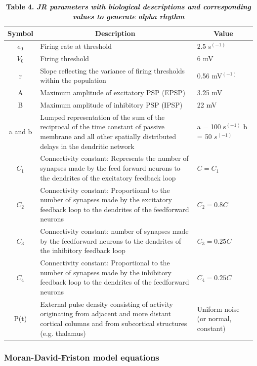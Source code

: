 \documentclass[12pt,twoside]{article}
\begin{document}
\begin{table}[H]
\centering %
\begin{tabular}{|c|p{10cm}|p{4cm}| }
\hline
Symbol & \multicolumn{1}{|c|}{Description} & \multicolumn{1}{c|}{Value}  \\ 
 \hline
{$e_{0}$} & Firing rate at threshold & 2.5 s$^{(-1)}$ \\ 
 \hline
 $V_{0}$ & Firing threshold	& 6 mV \\ 
 \hline
 r	& Slope reflecting the variance of firing thresholds within the population &	0.56 mV$^{(-1)}$ \\
 \hline
 A &	Maximum amplitude of excitatory PSP (EPSP)&	3.25 mV \\
 \hline
 B & Maximum amplitude of inhibitory PSP (IPSP) &22 mV \\
 \hline
 a and b &	Lumped representation of the sum of the reciprocal of the time constant of passive membrane and all other spatially distributed delays in the dendritic network	& a = 100 s$^{(-1)}$ \newline b = 50 $s^{(-1)}$\\
\hline
$C_{1}$ & Connectivity constant: Represents the number of synapses made by the feed forward neurons to the dendrites of the excitatory feedback loop &	$C=C_{1}$ \newline135\\
\hline
$C_{2}$ & Connectivity constant: Proportional to the number of synapses made by the excitatory feedback loop to the dendrites of the feedforward neurons & $C_{2}=0.8C$\\
\hline
$C_{3}$ & Connectivity constant: number of synapses made by the feedforward neurons to the dendrites of the inhibitory feedback loop & $C_{3}=0.25C$\\
\hline
$C_{4}$	& Connectivity constant: Proportional to the number of synapses made by the inhibitory feedback loop to the dendrites of the feedforward neurons & $C_{4}=0.25C$\\
\hline
P(t) & External pulse density consisting of activity originating from adjacent and more distant cortical columns and from subcortical structures (e.g. thalamus) & Uniform noise (or normal, constant)\\
\hline
\end{tabular}
\caption*{\textbf{Table 4.  \textit{JR parameters with biological descriptions and corresponding values to generate alpha rhythm}}} 
\label{tab:Jansen-Rit}
\end{table}

\subsubsection*{Moran-David-Friston model equations}
\end{document}
